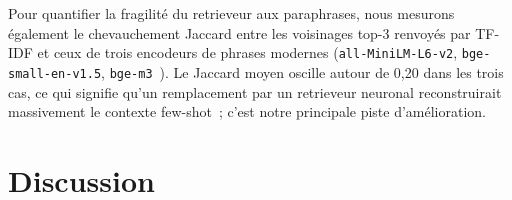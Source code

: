 \documentclass[]{ceurart}
\begin{document}
Pour quantifier la fragilité du retrieveur aux paraphrases, nous mesurons également le chevauchement Jaccard entre les voisinages top-3 renvoyés par TF-IDF et ceux de trois encodeurs de phrases modernes (\texttt{all-MiniLM-L6-v2}, \texttt{bge-small-en-v1.5}, \texttt{bge-m3}~\cite{chen2024bge}). Le Jaccard moyen oscille autour de 0{,}20 dans les trois cas, ce qui signifie qu'un remplacement par un retrieveur neuronal reconstruirait massivement le contexte few-shot~; c'est notre principale piste d'amélioration.

\section{Discussion}
\label{sec:discussion}
\end{document}
